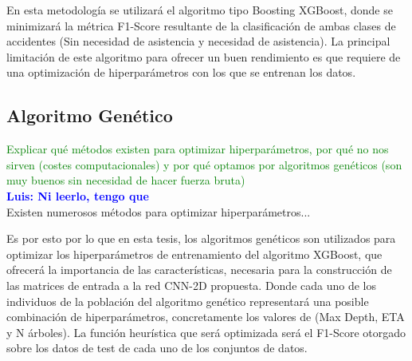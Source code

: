 \documentclass{uathesis-es}
\begin{document}
En esta metodología se utilizará el algoritmo tipo Boosting XGBoost, donde se minimizará la métrica F1-Score resultante de la clasificación de ambas clases de accidentes (Sin necesidad de asistencia y necesidad de asistencia). La principal limitación de este algoritmo para ofrecer un buen rendimiento es que requiere de una optimización de hiperparámetros con los que se entrenan los datos. %


 


\subsection{Algoritmo Genético}
\textcolor{green}{Explicar qué métodos existen para optimizar hiperparámetros, por qué no nos sirven (costes computacionales) y por qué optamos por algoritmos genéticos (son muy buenos sin necesidad de hacer fuerza bruta)}\\

\textcolor{blue}{\textbf{Luis: Ni leerlo, tengo que }}\\

Existen numerosos métodos para optimizar hiperparámetros...

Es por esto por lo que en esta tesis, los algoritmos genéticos son utilizados para optimizar los hiperparámetros de entrenamiento del algoritmo XGBoost, que ofrecerá la importancia de las características, necesaria para la construcción de las matrices de entrada a la red CNN-2D propuesta. Donde cada uno de los individuos de la población del algoritmo genético representará una posible combinación de hiperparámetros, concretamente los valores de (Max Depth, ETA y N árboles). La función heurística que será optimizada será el F1-Score otorgado sobre los datos de test de cada uno de los conjuntos de datos.
\end{document}
